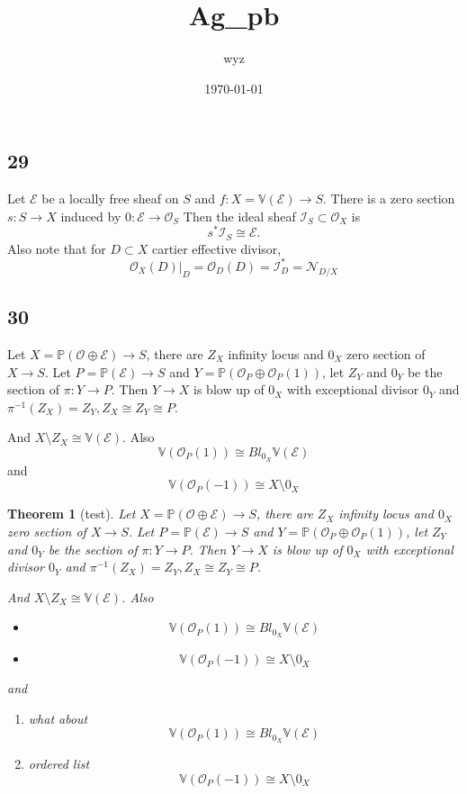 \documentclass{article}
\title{Ag_pb}
\author{wyz}
\date{\today}
\newtheorem{theorem}[definition]{Theorem}
\begin{document}
\subsection{29}
Let $\mathcal{E}$ be a locally free sheaf on  $S$ and $f:X= \mathbb{V}(\mathcal{E})\to S$. There is a zero section $s: S \to X$ induced by $0:\mathcal{E} \to \mathcal{O}_{S}$  
Then the ideal sheaf $\mathcal{I}_{S} \subset \mathcal{O}_{X}$  is 
\[
  s^{*}\mathcal{I}_{S} \cong \mathcal{E}.
\]
Also note that for $D \subset X$ cartier effective divisor,
\[
  \mathcal{O}_{X}(D)|_{D}=\mathcal{O}_{D}(D)=\mathcal{I}_{D}^{*}=\mathcal{N}_{D/X}
\]

\subsection{30}
Let $X= \mathbb{P}(\mathcal{O} \oplus \mathcal{E}) \to S$,
there are $Z_{X}$ infinity locus and  $ 0_{X} $ zero section of $X\to S$.   Let $P=\mathbb{P}(\mathcal{E})\to S$ and $Y=\mathbb{P}(\mathcal{O}_{P} \oplus \mathcal{O}_{P}(1))$, let $Z_{Y}$ and $0_{Y}$ be the section of $\pi:Y\to P$. Then $Y\to X$ is blow up of $0_{X}$ with exceptional divisor $0_{Y}$ and $\pi^{-1}(Z_{X})=Z_{Y}, Z_{X}\cong Z_{Y}\cong P$.

And $X \setminus Z_{X} \cong \mathbb{V}(\mathcal{E})$. Also 
\[
  \mathbb{V}(\mathcal{O}_{P}(1)) \cong Bl_{0_{X}} \mathbb{V}(\mathcal{E})
\]
and
\[
  \mathbb{V}(\mathcal{O}_{P}(-1))\cong X \setminus 0_{X}
\]
\begin{theorem}[test]
Let $X= \mathbb{P}(\mathcal{O} \oplus \mathcal{E}) \to S$,
there are $Z_{X}$ infinity locus and  $ 0_{X} $ zero section of $X\to S$.   Let $P=\mathbb{P}(\mathcal{E})\to S$ and $Y=\mathbb{P}(\mathcal{O}_{P} \oplus \mathcal{O}_{P}(1))$, let $Z_{Y}$ and $0_{Y}$ be the section of $\pi:Y\to P$. Then $Y\to X$ is blow up of $0_{X}$ with exceptional divisor $0_{Y}$ and $\pi^{-1}(Z_{X})=Z_{Y}, Z_{X}\cong Z_{Y}\cong P$.

And $X \setminus Z_{X} \cong \mathbb{V}(\mathcal{E})$. Also 
\begin{itemize}
  \item 
\[
  \mathbb{V}(\mathcal{O}_{P}(1)) \cong Bl_{0_{X}} \mathbb{V}(\mathcal{E})
\]
\item
\[
  \mathbb{V}(\mathcal{O}_{P}(-1))\cong X \setminus 0_{X}
\]
\end{itemize}
and
\begin{enumerate}
  \item what about
\[
  \mathbb{V}(\mathcal{O}_{P}(1)) \cong Bl_{0_{X}} \mathbb{V}(\mathcal{E})
\]
\item ordered list
\[
  \mathbb{V}(\mathcal{O}_{P}(-1))\cong X \setminus 0_{X}
\]
\end{enumerate}
\end{theorem}


\maketitle
\end{document}
